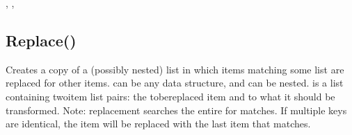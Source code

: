 \documentclass[letterpaper,10pt,english]{sphinxmanual}
\begin{document}
\sphinxAtStartPar
{}

\begin{sphinxVerbatim}[commandchars=\\\{\}]
\end{sphinxVerbatim}

\sphinxAtStartPar
{}

\begin{sphinxVerbatim}[commandchars=\\\{\}]
\PYG{p}{[}\PYG{p}{]}
\PYG{p}{[}\PYG{p}{]}
\end{sphinxVerbatim}

\sphinxAtStartPar
{}

\sphinxAtStartPar
{}, , 

\ignorespaces 

\subsection{Replace()}
\label{\detokenize{reference/design:replace}}\label{\detokenize{reference/design:index-13}}
\sphinxAtStartPar
{}

\sphinxAtStartPar
{}

\sphinxAtStartPar
Creates a copy of a (possibly nested) list in which             items matching some list are replaced for other items.                   can be any data structure, and can be nested.             is a list containing two\sphinxhyphen{}item list pairs:                 the to\sphinxhyphen{}be\sphinxhyphen{}replaced item and to what it should be transformed. Note: replacement searches the entire  for           matches.  If multiple keys are identical, the item will be              replaced with the last item that matches.
\end{document}
